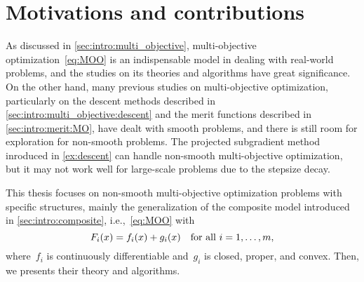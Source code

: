 \documentclass[../main]{subfiles}
\begin{document}
\section{Motivations and contributions}
As discussed in \cref{sec:intro:multi_objective}, multi-objective optimization~\cref{eq:MOO} is an indispensable model in dealing with real-world problems, and the studies on its theories and algorithms have great significance.
On the other hand, many previous studies on multi-objective optimization, particularly on the descent methods described in \cref{sec:intro:multi_objective:descent} and the merit functions described in \cref{sec:intro:merit:MO}, have dealt with smooth problems, and there is still room for exploration for non-smooth problems.
The projected subgradient method inroduced in \cref{ex:descent} can handle non-smooth multi-objective optimization, but it may not work well for large-scale problems due to the stepsize decay.

This thesis focuses on non-smooth multi-objective optimization problems with specific structures, mainly the generalization of the composite model introduced in \cref{sec:intro:composite}, i.e.,~\cref{eq:MOO} with
\[ \label{eq:composite_MO}
    F_i(x) = f_i(x) + g_i(x) \quad \text{for all~$i = 1, \dots, m$}
,\] 
where~$f_i$ is continuously differentiable and~$g_i$ is closed, proper, and convex.
Then, we presents their theory and algorithms.
\end{document}
